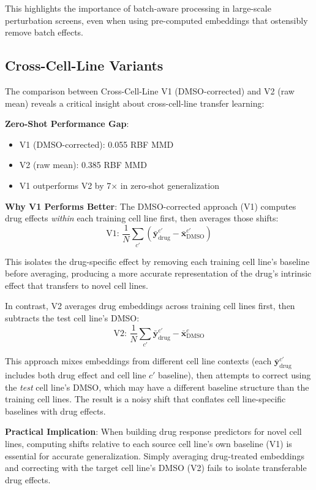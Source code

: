 \documentclass[conference]{IEEEtran}
\begin{document}
This highlights the importance of batch-aware processing in large-scale perturbation screens, even when using pre-computed embeddings that ostensibly remove batch effects.

\subsection{Cross-Cell-Line Variants}

The comparison between Cross-Cell-Line V1 (DMSO-corrected) and V2 (raw mean) reveals a critical insight about cross-cell-line transfer learning:

\textbf{Zero-Shot Performance Gap}:
\begin{itemize}
    \item V1 (DMSO-corrected): 0.055 RBF MMD
    \item V2 (raw mean): 0.385 RBF MMD
    \item V1 outperforms V2 by 7× in zero-shot generalization
\end{itemize}

\textbf{Why V1 Performs Better}: The DMSO-corrected approach (V1) computes drug effects \textit{within} each training cell line first, then averages those shifts:
\begin{equation}
\text{V1: } \frac{1}{N}\sum_{c'} (\bar{\mathbf{y}}_{\text{drug}}^{c'} - \bar{\mathbf{x}}_{\text{DMSO}}^{c'})
\end{equation}

This isolates the drug-specific effect by removing each training cell line's baseline before averaging, producing a more accurate representation of the drug's intrinsic effect that transfers to novel cell lines.

In contrast, V2 averages drug embeddings across training cell lines first, then subtracts the test cell line's DMSO:
\begin{equation}
\text{V2: } \frac{1}{N}\sum_{c'} \bar{\mathbf{y}}_{\text{drug}}^{c'} - \bar{\mathbf{x}}_{\text{DMSO}}^{c}
\end{equation}

This approach mixes embeddings from different cell line contexts (each $\bar{\mathbf{y}}_{\text{drug}}^{c'}$ includes both drug effect and cell line $c'$ baseline), then attempts to correct using the \textit{test} cell line's DMSO, which may have a different baseline structure than the training cell lines. The result is a noisy shift that conflates cell line-specific baselines with drug effects.

\textbf{Practical Implication}: When building drug response predictors for novel cell lines, computing shifts relative to each source cell line's own baseline (V1) is essential for accurate generalization. Simply averaging drug-treated embeddings and correcting with the target cell line's DMSO (V2) fails to isolate transferable drug effects.
\end{document}
